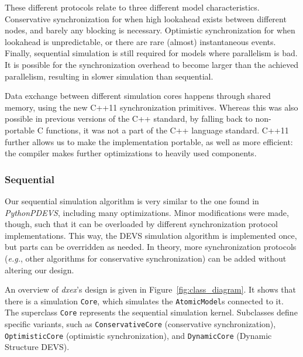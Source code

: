 These different protocols relate to three different model characteristics.
Conservative synchronization for when high lookahead exists between different nodes, and barely any blocking is necessary.
Optimistic synchronization for when lookahead is unpredictable, or there are rare (almost) instantaneous events.
Finally, sequential simulation is still required for models where parallelism is bad. 
It is possible for the synchronization overhead to become larger than the achieved parallelism, resulting in slower simulation than sequential.

Data exchange between different simulation cores happens through shared memory, using the new C++11 synchronization primitives.
Whereas this was also possible in previous versions of the C++ standard, by falling back to non-portable C functions, it was not a part of the C++ language standard.
C++11 further allows us to make the implementation portable, as well as more efficient: the compiler makes further optimizations to heavily used components.

\subsubsection{Sequential}
Our sequential simulation algorithm is very similar to the one found in \textit{PythonPDEVS}, including many optimizations.
Minor modifications were made, though, such that it can be overloaded by different synchronization protocol implementations.
This way, the \textsf{DEVS} simulation algorithm is implemented once, but parts can be overridden as needed.
In theory, more synchronization protocols (\textit{e.g.}, other algorithms for conservative synchronization) can be added without altering our design.

An overview of \textit{dxex}'s design is given in Figure~\ref{fig:class_diagram}.
It shows that there is a simulation \texttt{Core}, which simulates the \texttt{AtomicModel}s connected to it.
The superclass \texttt{Core} represents the sequential simulation kernel.
Subclasses define specific variants, such as \texttt{ConservativeCore} (conservative synchronization), \texttt{OptimisticCore} (optimistic synchronization), and \texttt{DynamicCore} (\textsf{Dynamic Structure DEVS}).

